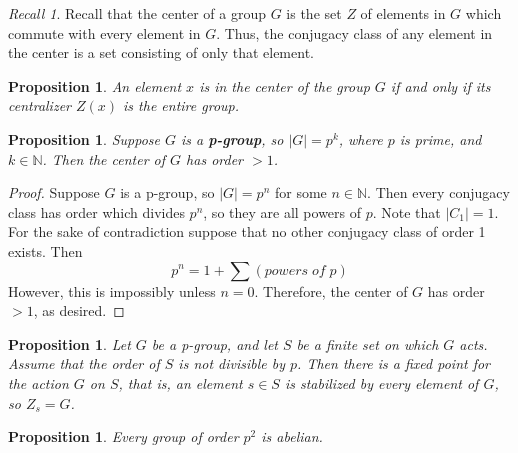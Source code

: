 \documentclass[12pt]{article}
\newtheorem{prop}[thm]{Proposition}
\theoremstyle{definition}
\theoremstyle{remark}
\newtheorem*{rec}{Recall}
\numberwithin{equation}{section}
\newcommand\N{\mathbb N}    %
\newcommand\B[1]{\textbf{ #1}}
\begin{document}
\vspace{15pt}


\begin{rec}
        Recall that the center of a group $G$ is the set $Z$ of elements in $G$ which commute with every element in $G$. Thus, the conjugacy class of any element in the center is a set consisting of only that element.
\end{rec}


\vspace{15pt}

\begin{prop}
        An element $x$ is in the center of the group $G$ if and only if its centralizer $Z(x)$ is the entire group.
\end{prop}


\vspace{15pt}

\begin{prop}
        Suppose $G$ is a \B{p-group}, so $|G| = p^k$, where $p$ is prime, and $k \in \N$. Then the center of $G$ has order $> 1$.
\end{prop}
\begin{proof}
        Suppose $G$ is a p-group, so $|G| = p^n$ for some $n \in \N$. Then every conjugacy class has order which divides $p^n$, so they are all powers of $p$. Note that $|C_1| = 1$. For the sake of contradiction suppose that no other conjugacy class of order 1 exists. Then \begin{equation}
                p^n = 1 + \sum(powers\;of\;p)
        \end{equation}
        However, this is impossibly unless $n = 0$. Therefore, the center of $G$ has order $> 1$, as desired.
\end{proof}


\vspace{15pt}

\begin{prop}
        Let $G$ be a p-group, and let $S$ be a finite set on which $G$ acts. Assume that the order of $S$ is not divisible by $p$. Then there is a fixed point for the action $G$ on $S$, that is, an element $s \in S$ is stabilized by every element of $G$, so $Z_s = G$.
\end{prop}

\vspace{15pt}

\begin{prop}
        Every group of order $p^2$ is abelian.
\end{prop}
\end{document}
